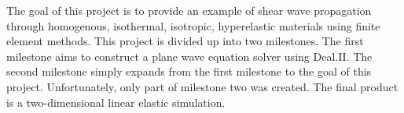 The goal of this project is to provide an example of shear wave propagation through homogenous, isothermal, isotropic, hyperelastic materials using finite element methods. This project is divided up into two milestones. The first milestone aims to construct a plane wave equation solver using Deal.II. The second milestone simply expands from the first milestone to the goal of this project. Unfortunately, only part of milestone two was created. The final product is a two-dimensional linear elastic simulation. 
